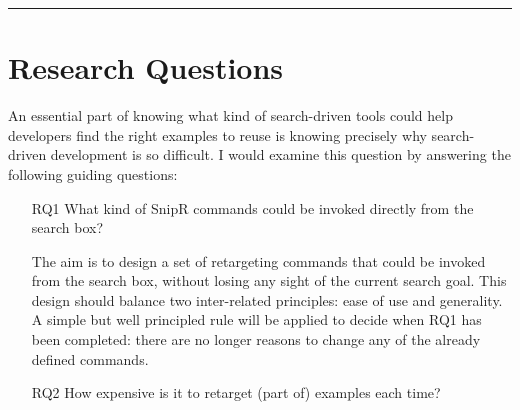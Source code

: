 \fancybreak{\pfbreakdisplay}

\section{Research Questions}
\label{sec:questions}

An essential part of knowing what kind of search-driven tools could help developers find the right examples to reuse is knowing precisely why search-driven development is so difficult. I would examine this question by answering the following guiding questions: 

\begin{itemize}
	
	\item[RQ1] What kind of SnipR commands could be invoked directly from the search box? 
	
	The aim is to design a set of retargeting commands that could be invoked from the search box, 
	without losing any sight of the current search goal. This design should balance two 
	inter-related principles: ease of use and generality. A simple but well principled rule 
	will be applied to decide when RQ1 has been completed: there are no longer reasons to 
	change any of the already defined commands.
		
	\item[RQ2] How expensive is it to retarget (part of) examples each time?
	

\end{itemize}
